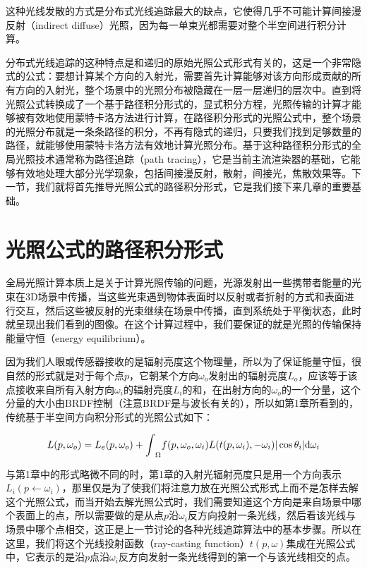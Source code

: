 这种光线发散的方式是分布式光线追踪最大的缺点，它使得几乎不可能计算间接漫反射（indirect diffuse）光照，因为每一单束光都需要对整个半空间进行积分计算。

分布式光线追踪的这种特点是和递归的原始光照公式形式有关的，这是一个非常隐式的公式：要想计算某个方向的入射光，需要首先计算能够对该方向形成贡献的所有方向的入射光，整个场景中的光照分布被隐藏在一层一层递归的层次中。直到\cite{a:TheRenderingEquation}将光照公式转换成了一个基于路径积分形式的，显式积分方程，光照传输的计算才能够被有效地使用蒙特卡洛方法进行计算，在路径积分形式的光照公式中，整个场景的光照分布就是一条条路径的积分，不再有隐式的递归，只要我们找到足够数量的路径，就能够使用蒙特卡洛方法有效地计算光照分布。基于这种路径积分形式的全局光照技术通常称为路径追踪（path tracing），它是当前主流渲染器的基础，它能够有效地处理大部分光学现象，包括间接漫反射，散射，间接光，焦散效果等。下一节，我们就将首先推导光照公式的路径积分形式，它是我们接下来几章的重要基础。







\section{光照公式的路径积分形式}\label{sec:pt-surface-form}
全局光照计算本质上是关于计算光照传输的问题，光源发射出一些携带者能量的光束在3D场景中传播，当这些光束遇到物体表面时以反射或者折射的方式和表面进行交互，然后这些被反射的光束继续在场景中传播，直到系统处于平衡状态，此时就呈现出我们看到的图像。在这个计算过程中，我们要保证的就是光照的传输保持能量守恒（energy equilibrium）。

因为我们人眼或传感器接收的是辐射亮度这个物理量，所以为了保证能量守恒，很自然的形式就是对于每个点$p$，它朝某个方向$\omega_o$发射出的辐射亮度$L_o$，应该等于该点接收来自所有入射方向$\omega_i$的辐射亮度$L_i$的和，在出射方向的$\omega_o$的一个分量，这个分量的大小由BRDF控制（注意BRDF是与波长有关的），所以如第1章所看到的，传统基于半空间方向积分形式的光照公式如下：

\begin{equation}\label{e:hemisphere-formulation}
	L(p,\omega_o)=L_e(p,\omega_o)+{\rm \int}_{\Omega}f(p,\omega_o,\omega_i)L(t(p,\omega_i),-\omega_i)|\cos\theta_i|{\rm d}\omega_i
\end{equation}

\noindent 与第1章中的形式略微不同的时，第1章的入射光辐射亮度只是用一个方向表示$L_i(p\leftarrow\omega_i)$，那里仅是为了使我们将注意力放在光照公式形式上而不是怎样去解这个光照公式，而当开始去解光照公式时，我们需要知道这个方向是来自场景中哪个表面上的点，所以需要做的是从点$p$沿$\omega_i$反方向投射一条光线，然后看该光线与场景中哪个点相交，这正是上一节讨论的各种光线追踪算法中的基本步骤。所以在这里，我们将这个光线投射函数（ray-casting function）$t(p,\omega)$集成在光照公式中，它表示的是沿$p$点沿$\omega_i$反方向发射一条光线得到的第一个与该光线相交的点。


